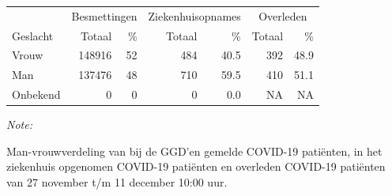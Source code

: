 \documentclass[
  english,
  man,floatsintext]{apa6}
\begin{document}
\newpage

\begin{table}
\centering\begingroup\fontsize{11}{13}\selectfont

\begin{threeparttable}
\begin{tabular}{lrrrrrr}
\toprule
\multicolumn{1}{c}{ } & \multicolumn{2}{c}{Besmettingen} & \multicolumn{2}{c}{Ziekenhuisopnames} & \multicolumn{2}{c}{Overleden} \\
\cmidrule(l{3pt}r{3pt}){2-3} \cmidrule(l{3pt}r{3pt}){4-5} \cmidrule(l{3pt}r{3pt}){6-7}
Geslacht & Totaal & \% & Totaal & \% & Totaal & \%\\
\midrule
Vrouw & 148916 & 52 & 484 & 40.5 & 392 & 48.9\\
Man & 137476 & 48 & 710 & 59.5 & 410 & 51.1\\
Onbekend & 0 & 0 & 0 & 0.0 & NA & NA\\
\bottomrule
\end{tabular}
\begin{tablenotes}
\item \textit{Note: } 
\item Man-vrouwverdeling van bij de GGD’en gemelde COVID-19 patiënten, in het ziekenhuis opgenomen COVID-19 patiënten en overleden COVID-19 patiënten van 27 november t/m 11 december 10:00 uur.
\end{tablenotes}
\end{threeparttable}
\endgroup{}
\end{table}
\newpage
\end{document}
